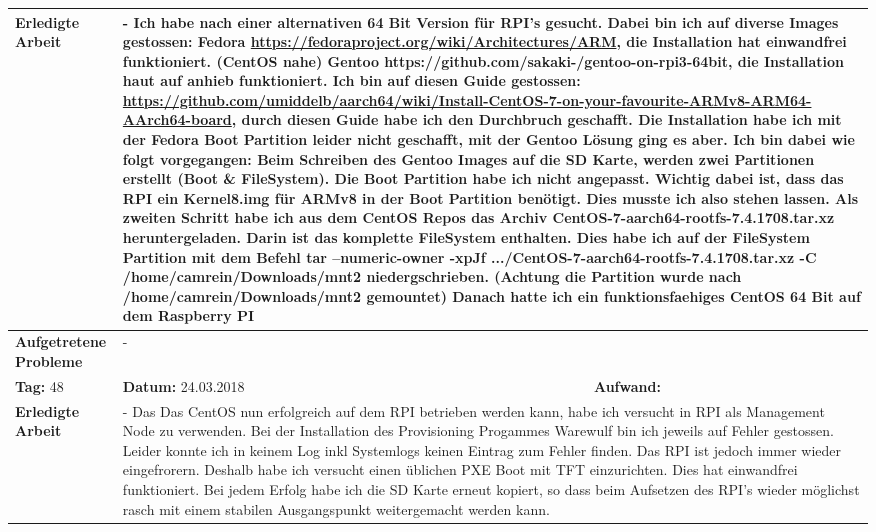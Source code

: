 \begin{longtable}{|p{5cm}|p{5cm}|p{6cm}|}
\textbf{Erledigte Arbeit} & \multicolumn{2}{p{11cm}|}{- Ich habe nach einer alternativen 64 Bit Version für RPI's gesucht. Dabei bin ich auf diverse Images gestossen: \newline Fedora \url{https://fedoraproject.org/wiki/Architectures/ARM}, die Installation hat einwandfrei funktioniert. (CentOS nahe) \newline Gentoo https://github.com/sakaki-/gentoo-on-rpi3-64bit, die Installation haut auf anhieb funktioniert. Ich bin auf diesen Guide gestossen: \url{https://github.com/umiddelb/aarch64/wiki/Install-CentOS-7-on-your-favourite-ARMv8-ARM64-AArch64-board}, durch diesen Guide habe ich den Durchbruch geschafft. Die Installation habe ich mit der Fedora Boot Partition leider nicht geschafft, mit der Gentoo Lösung ging es aber. Ich bin dabei wie folgt vorgegangen: Beim Schreiben des Gentoo Images auf die SD Karte, werden zwei Partitionen erstellt (Boot \& FileSystem). Die Boot Partition habe ich nicht angepasst. Wichtig dabei ist, dass das RPI ein Kernel8.img für ARMv8 in der Boot Partition benötigt. Dies musste ich also stehen lassen. Als zweiten Schritt habe ich aus dem CentOS Repos das Archiv CentOS-7-aarch64-rootfs-7.4.1708.tar.xz heruntergeladen. Darin ist das komplette FileSystem enthalten. Dies habe ich auf der FileSystem Partition mit dem Befehl tar --numeric-owner -xpJf .../CentOS-7-aarch64-rootfs-7.4.1708.tar.xz -C /home/camrein/Downloads/mnt2 niedergschrieben. (Achtung die Partition wurde nach /home/camrein/Downloads/mnt2 gemountet) Danach hatte ich ein funktionsfaehiges CentOS 64 Bit auf dem Raspberry PI} \\ \hline
\textbf{Aufgetretene Probleme} & \multicolumn{2}{p{11cm}|}{-} \\ \hline
\rowcolor{heading}\textbf{Tag:} 48 & \textbf{Datum:} 24.03.2018 & \textbf{Aufwand:} \\ \hline
\textbf{Erledigte Arbeit} & \multicolumn{2}{p{11cm}|}{- 	
Das Das CentOS nun erfolgreich auf dem RPI betrieben werden kann, habe ich versucht in RPI als Management Node zu verwenden. Bei der Installation des Provisioning Progammes Warewulf bin ich jeweils auf Fehler gestossen. Leider konnte ich in keinem Log inkl Systemlogs keinen Eintrag zum Fehler finden. Das RPI ist jedoch immer wieder eingefrorern. Deshalb habe ich versucht einen üblichen PXE Boot mit TFT einzurichten. Dies hat einwandfrei funktioniert. Bei jedem Erfolg habe ich die SD Karte erneut kopiert, so dass beim Aufsetzen des RPI's wieder möglichst rasch mit einem stabilen Ausgangspunkt weitergemacht werden kann.} \\ \hline

\end{longtable}
